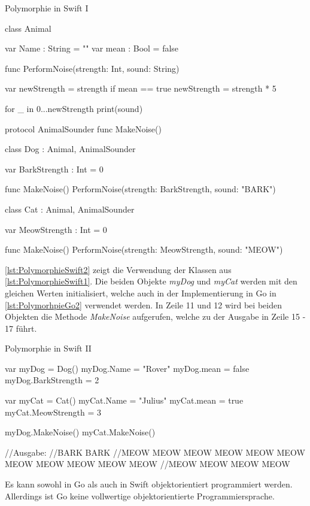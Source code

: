 \begin{listing}[H]
\caption{Polymorphie in Swift I}
\label{lst:PolymorphieSwift1}
\begin{SwiftCode}
class Animal{
    var Name : String = ""
    var mean : Bool = false
	
    func PerformNoise(strength: Int, sound: String){
        var newStrength = strength
        if mean == true{
            newStrength = strength * 5
        }
		
        for _ in 0...newStrength{
            print(sound)
        }
    }
}

protocol AnimalSounder{
    func MakeNoise()
}

class Dog : Animal, AnimalSounder{
    var BarkStrength : Int = 0
	
    func MakeNoise() {
        PerformNoise(strength: BarkStrength, sound: "BARK")
    }
}

class Cat : Animal, AnimalSounder{
    var MeowStrength : Int = 0
	
    func MakeNoise() {
        PerformNoise(strength: MeowStrength, sound: "MEOW")
    }
}
\end{SwiftCode}
\end{listing}

\autoref{lst:PolymorphieSwift2} zeigt die Verwendung der Klassen aus \autoref{lst:PolymorphieSwift1}.
Die beiden Objekte \textit{myDog} und \textit{myCat} werden mit den gleichen Werten initialisiert, welche auch in der Implementierung in Go in \autoref{lst:PolymorhpieGo2} verwendet werden.
In Zeile 11 und 12 wird bei beiden Objekten die Methode \textit{MakeNoise} aufgerufen, welche zu der Ausgabe in Zeile 15 - 17 führt. 

\begin{listing}[H]
\caption{Polymorphie in Swift II}
\label{lst:PolymorphieSwift2}
\begin{SwiftCode}
var myDog = Dog()
myDog.Name = "Rover"
myDog.mean = false
myDog.BarkStrength = 2

var myCat = Cat()
myCat.Name = "Julius"
myCat.mean = true
myCat.MeowStrength = 3

myDog.MakeNoise()
myCat.MakeNoise()

//Ausgabe: 
//BARK BARK 
//MEOW MEOW MEOW MEOW MEOW MEOW MEOW MEOW MEOW MEOW MEOW 
//MEOW MEOW MEOW MEOW 
\end{SwiftCode}
\end{listing}

Es kann sowohl in Go als auch in Swift objektorientiert programmiert werden. 
Allerdings ist Go keine vollwertige objektorientierte Programmiersprache. 

